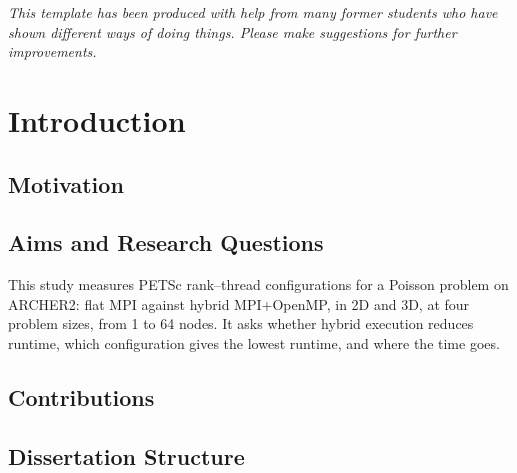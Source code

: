 \documentclass[12pt,a4paper,notitlepage]{report}
\begin{document}
\emph{This template has been produced with help from many former students who
have shown different ways of doing things. Please make suggestions for
further improvements.} 
%
\cleardoublepage
{}




\chapter{Introduction}
\label{ch:intro}

\section{Motivation}
\label{sec:motivation}

\section{Aims and Research Questions}
\label{sec:aims}
This study measures PETSc rank--thread configurations for a Poisson problem on ARCHER2:
flat MPI against hybrid MPI+OpenMP, in 2D and 3D, at four problem sizes, from 1 to 64
nodes. It asks whether hybrid execution reduces runtime, which configuration gives the
lowest runtime, and where the time goes.


\section{Contributions}
\label{sec:contributions}

\section{Dissertation Structure}
\label{sec:structure}
\end{document}
